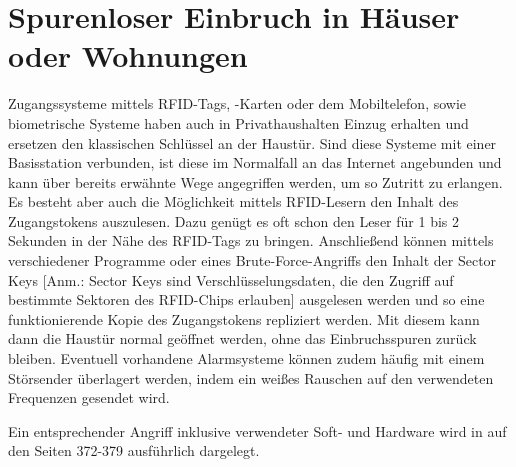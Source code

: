 \documentclass[12pt, a4paper, onecolumn, oneside, toc=bibliographynumbered, liststotoc]{scrreprt} %
\begin{document}
        \section{Spurenloser Einbruch in Häuser oder Wohnungen}
        Zugangssysteme mittels RFID-Tags, -Karten oder dem Mobiltelefon,  sowie biometrische Systeme haben auch in Privathaushalten Einzug erhalten und ersetzen den klassischen Schlüssel an der Haustür. Sind diese Systeme mit einer Basisstation verbunden, ist diese im Normalfall an das Internet angebunden und kann über bereits erwähnte Wege angegriffen werden, um so Zutritt zu erlangen. Es besteht aber auch die Möglichkeit mittels RFID-Lesern den Inhalt des Zugangstokens auszulesen. Dazu genügt es oft schon den Leser für 1 bis 2 Sekunden in der Nähe des RFID-Tags zu bringen. Anschließend können mittels verschiedener Programme oder eines Brute-Force-Angriffs den Inhalt der Sector Keys [Anm.: Sector Keys sind Verschlüsselungsdaten, die den Zugriff auf bestimmte Sektoren des RFID-Chips erlauben] ausgelesen werden und so eine funktionierende Kopie des Zugangstokens repliziert werden. Mit diesem kann dann die Haustür normal geöffnet werden, ohne das Einbruchsspuren zurück bleiben. Eventuell vorhandene Alarmsysteme können zudem häufig mit einem Störsender überlagert werden, indem ein weißes Rauschen auf den verwendeten Frequenzen gesendet wird.

        Ein entsprechender Angriff inklusive verwendeter Soft- und Hardware wird in  auf den Seiten 372-379 ausführlich dargelegt.
\end{document}
